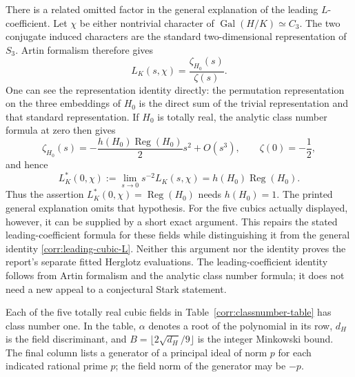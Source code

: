 There is a related omitted factor in the general explanation of the
leading $L$-coefficient.  Let $\chi$ be either nontrivial character of
$\operatorname{Gal}(H/K)\simeq C_3$.  The two conjugate induced
characters are the standard two-dimensional representation of $S_3$.
Artin formalism therefore gives
\begin{equation}\label{corr:artin-cubic}
 L_K(s,\chi)=\frac{\zeta_{H_0}(s)}{\zeta(s)}.
\end{equation}
One can see the representation identity directly: the permutation
representation on the three embeddings of $H_0$ is the direct sum
of the trivial representation and that standard representation.
If $H_0$ is totally real, the analytic class number formula at zero
then gives \cite{MilneCFT}
\[
 \zeta_{H_0}(s)=-\frac{h(H_0)\operatorname{Reg}(H_0)}{2}s^2+O(s^3),
 \qquad \zeta(0)=-\frac12,
\]
and hence
\begin{equation}\label{corr:leading-cubic-L}
 L_K^*(0,\chi):=\lim_{s\to0}s^{-2}L_K(s,\chi)
            =h(H_0)\operatorname{Reg}(H_0).
\end{equation}
Thus the assertion $L_K^*(0,\chi)=\operatorname{Reg}(H_0)$ needs
$h(H_0)=1$.  The printed general explanation omits that hypothesis.
For the five cubics actually displayed, however, it can be supplied
by a short exact argument.  This repairs the stated leading-coefficient
formula for these fields while distinguishing it from the general
identity \eqref{corr:leading-cubic-L}.  Neither this argument nor the
identity proves the report's separate fitted Herglotz evaluations.
The leading-coefficient identity follows from Artin formalism and the
analytic class number formula; it does not need a new appeal to a
conjectural Stark statement.

\begin{proposition}
\label{corr:cubic-class-numbers}
Each of the five totally real cubic fields in
Table~\ref{corr:classnumber-table} has class number one.  In the table,
$\alpha$ denotes a root of the polynomial in its row, $d_H$ is the
field discriminant, and $B=\lfloor 2\sqrt{d_H}/9\rfloor$ is the
integer Minkowski bound.  The final column lists a generator of a
principal ideal of norm $p$ for each indicated rational prime $p$;
the field norm of the generator may be $-p$.
\end{proposition}

